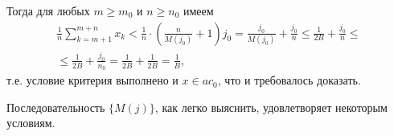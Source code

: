 Тогда для любых $m\geq m_0$ и $n\geq n_0$ имеем
\begin{multline}
	\frac{1}{n} \sum_{k=m+1}^{m+n} x_k
	<
	\frac{1}{n} \cdot \left( \frac{n}{M(j_0)} + 1 \right) j_0
	=
	\frac{j_0}{M(j_0)} + \frac{j_0}{n}
	\leq
	\frac{1}{2B} + \frac{j_0}{n}
	\leq
	\\ \leq
	\frac{1}{2B} + \frac{j_0}{n_0}
	=
	\frac{1}{2B} + \frac{1}{2B}
	=
	\frac{1}{B}
	,
\end{multline}
т.е. условие критерия выполнено
и $x\in ac_0$,
что и требовалось доказать.

Последовательность $\{M(j)\}$, как легко выяснить, удовлетворяет некоторым условиям.

